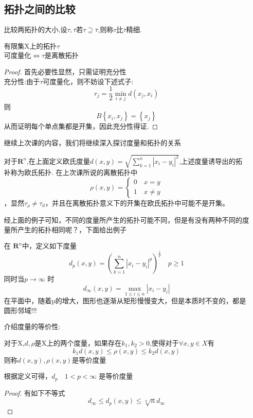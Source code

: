 \subsection*{拓扑之间的比较}
比较两拓扑的大小,设\(\tau,\overline{\tau}\)若\(\tau \supseteq \overline{\tau} \),则称\(\tau\)比\(\overline{\tau}\)精细.
\begin{corollary}
    有限集X上的拓扑\(\tau\) \\
    可度量化\(\Longleftrightarrow \)\(\tau\)是离散拓扑
\end{corollary}
\begin{proof}
    首先必要性显然，只需证明充分性\\
    充分性:由于\(\tau\)可度量化，则不妨设下述式子:
    \[r_j=\frac{1}{2}\min\limits_{i \neq j} d(x_j,x_i)\]则
    \[B\left\{x_i,x_j\right\}=\left\{x_j\right\}\]
    从而证明每个单点集都是开集，因此充分性得证.
\end{proof}
继续上次课的内容，我们将继续深入探讨度量和拓扑的关系
\begin{example}
    对于\({\mathbf{R}}^{n}\),在上面定义欧氏度量\(d(x,y)=\sqrt{\sum_{k=1}^{n}{|x_i-y_i|}^2}\),上述度量诱导出的拓补称为欧氏拓扑.
    在上次课所说的离散拓扑中
    \[\rho(x,y)=\begin{cases}
        0 \quad x =y \\
        1 \quad x\neq y
    \end{cases}\]，显然\({\tau}_{\rho} \neq {\tau}_d\)，并且在离散拓扑意义下的开集在欧氏拓扑中可能不是开集。
\end{example}
经上面的例子可知，不同的度量所产生的拓扑可能不同，但是有没有两种不同的度量所产生的拓扑相同呢？，下面给出例子
\begin{example}
    在 \({\mathbf{R}^{n}}\)中，定义如下度量 \[d_p(x,y)={\left(\sum_{k=1}^{n}{|x_i-y_i|}^p\right)}^{\frac{1}{p}} \quad p \geq 1\]
    同时当\(p \rightarrow \infty\) 时
    \[d_{\infty}(x,y)=\max\limits_{1\leq i \leq n}|x_i-y_i|\]
    在平面中，随着p的增大，图形也逐渐从矩形慢慢变大，但是本质时不变的，都是圆形邻域!!!
\end{example}
介绍度量的等价性:
\begin{definition}
    对于X,\(d,\rho\)是X上的两个度量，如果存在\(k_1,k_2 >0\),使得对于\(\forall x, y \in X\)有
    \[k_1d(x,y)\leq \rho(x,y)\leq k_2d(x,y)\]
    则称\(d(x,y),\rho(x,y)\)是等价度量
\end{definition}
根据定义可得，\(d_p \quad 1<p<\infty\) 是等价度量
\begin{proof}
    有如下不等式
    \[d_{\infty}\leq d_p(x,y)\leq \sqrt[n]{n}d_{\infty}\]
\end{proof}
